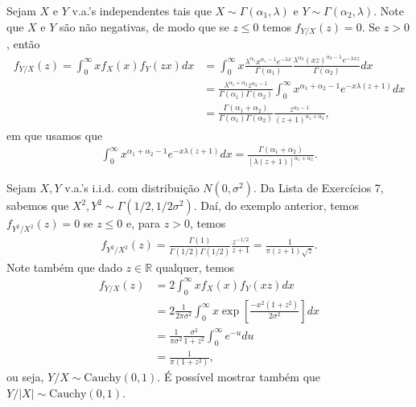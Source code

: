 \documentclass[../Notas.tex]{subfiles}
\begin{document}
\begin{example}
Sejam $X$ e $Y$ v.a.'s independentes tais que $X\sim\Gamma(\alpha_1, \lambda)$ e $Y\sim\Gamma(\alpha_2, \lambda)$. Note que $X$ e $Y$ são não negativas, de modo que se $z\leq 0$ temos $f_{Y/X}(z) = 0$. Se $z>0$, então
\begin{align*}
    f_{Y/X}(z) = \int_{0}^{\infty} xf_X(x)f_Y(zx) dx &= \int_{0}^{\infty} x\frac{ \lambda^{\alpha_1}x^{\alpha_1 - 1}e^{-\lambda x} }{\Gamma(\alpha_1)}\frac{ \lambda^{\alpha_2}(xz)^{\alpha_2 - 1}e^{-\lambda xz} }{\Gamma(\alpha_2)} dx \\
    &= \frac{ \lambda^{\alpha_1+\alpha_2}z^{\alpha_2 - 1} }{\Gamma(\alpha_1)\Gamma(\alpha_2)} \int_{0}^{\infty} x^{\alpha_1 + \alpha_2 - 1}e^{-x\lambda (z+1)} dx \\
    &= \frac{ \Gamma(\alpha_1 + \alpha_2) }{ \Gamma(\alpha_1)\Gamma(\alpha_2) }\frac{z^{\alpha_2 - 1}}{(z+1)^{\alpha_1 + \alpha_2}},
\end{align*}
em que usamos que
\begin{align*}
    \int_{0}^{\infty} x^{\alpha_1 + \alpha_2 - 1}e^{-x\lambda (z+1)} dx = \frac{ \Gamma(\alpha_1+\alpha_2) }{[\lambda(z+1)]^{\alpha_1+\alpha_2}}.
\end{align*}
\end{example}

\begin{example}
Sejam $X,Y$ v.a.'s i.i.d. com distribuição $N(0, \sigma^2)$. Da Lista de Exercícios 7, sabemos que $X^2, Y^2\sim\Gamma(1/2, 1/2\sigma^2)$. Daí, do exemplo anterior, temos $f_{Y^2/X^2}(z) = 0$ se $z\leq 0$ e, para $z>0$, temos
\begin{align*}
    f_{Y^2/X^2}(z) = \frac{ \Gamma(1) }{ \Gamma(1/2)\Gamma(1/2) }\frac{z^{-1/2}}{z+1} = \frac{1}{\pi(z+1)\sqrt{z}}.
\end{align*}
Note também que dado $z\in\mathbb{R}$ qualquer, temos
\begin{align*}
    f_{Y/X}(z) &= 2\int_{0}^{\infty} xf_X(x)f_Y(xz) dx \\
    &= 2\frac{1}{2\pi\sigma^2}\int_{0}^{\infty} x\exp[ \frac{-x^2(1+z^2)}{2\sigma^2} ] dx \\
    &= \frac{1}{\pi\sigma^2}\frac{\sigma^2}{1+z^2}\int_{0}^{\infty} e^{-u} du \\
    &= \frac{1}{\pi(1+z^2)},
\end{align*}
ou seja, $Y/X\sim\text{Cauchy}(0,1)$. É possível mostrar também que $Y/|X|\sim\text{Cauchy}(0,1)$.
\end{example}
\end{document}
